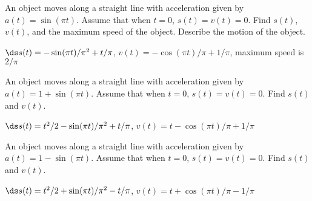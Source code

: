 \begin{exercises}
\exercise An object moves along a straight line with acceleration given by
$a(t) = \sin(\pi t)$. Assume that when $t=0$, $s(t)=v(t)=0$. Find
$s(t)$, $v(t)$, and the maximum speed of the object. Describe the
motion of the object.
\begin{answer} $\ds s(t)=-\sin(\pi t)/\pi^2+t/\pi$,\hfill\break
 $v(t)=-\cos(\pi t)/\pi+1/\pi$,\hfill\break
maximum speed is $2/\pi$
\end{answer}

\exercise An object moves along a straight line with acceleration given by
$a(t) = 1+\sin(\pi t)$. Assume that when $t=0$, $s(t)=v(t)=0$. Find
$s(t)$ and $v(t)$.
\begin{answer} $\ds s(t)=t^2/2-\sin(\pi t)/\pi^2+t/\pi$,\hfill\break
 $v(t)=t-\cos(\pi t)/\pi+1/\pi$
\end{answer}

\exercise An object moves along a straight line with acceleration given by
$a(t) = 1-\sin(\pi t)$. Assume that when $t=0$, $s(t)=v(t)=0$. Find
$s(t)$ and $v(t)$.
\begin{answer} $\ds s(t)=t^2/2+\sin(\pi t)/\pi^2-t/\pi$,\hfill\break
 $v(t)=t+\cos(\pi t)/\pi-1/\pi$
\end{answer}

\end{exercises}

